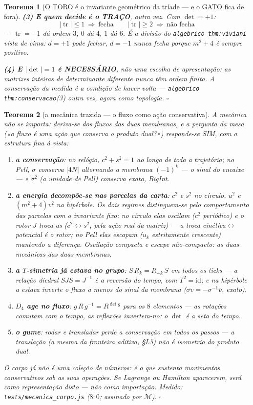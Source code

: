 \documentclass[11pt,a4paper]{article}
\newcommand{\abs}[1]{\lvert #1\rvert}
\newtheorem{teorema}{Teorema}
\newcommand{\code}[1]{\texttt{#1}}
\begin{document}
\begin{teorema}[O TORO é o invariante geométrico da tríade --- e o GATO fica de
fora]
\textbf{(3) E quem decide é o TRAÇO}, outra vez. Com $\det=+1$:
\[
\abs{\operatorname{tr}}\le1\ \Rightarrow\ \text{fecha}\qquad
\abs{\operatorname{tr}}\ge2\ \Rightarrow\ \text{não fecha}
\]
--- $\operatorname{tr}=-1$ dá ordem $3$, $0$ dá $4$, $1$ dá $6$. É a divisão do
\code{algebrico thm:viviani} vista de cima: $d=+1$ pode fechar, $d=-1$ nunca fecha porque
$m^{2}+4$ é sempre positivo.

\textbf{(4) E $\abs{\det}=1$ é NECESSÁRIO}, não uma escolha de apresentação: as matrizes
inteiras de determinante diferente \emph{nunca} têm ordem finita. \emph{A conservação da
medida é a condição de haver volta} --- \code{algebrico thm:conservacao}(3) outra vez, agora
como topologia. $\square$
\end{teorema}\begin{teorema}[a mecânica trazida --- o fluxo como ação
conservativa]\label{thm:mecanica}
A mecânica não se importa: \emph{deriva-se} dos fluxos das duas
membranas, e a pergunta da mesa («o fluxo é uma ação que conserva o
produto dual?») responde-se SIM, com a estrutura fina à vista:
\begin{enumerate}
\item \textbf{a conservação}: no relógio, $c^{2}+s^{2}=1$ ao longo de
toda a trajetória; no Pell, $\sigma$ conserva $|4N|$ \emph{alternando
a membrana} $(-1)^{k}$ --- o sinal do encaixe --- e $\sigma^{2}$ (a
unidade de Pell) conserva \emph{exato}, BigInt.
\item \textbf{a energia decompõe-se nas parcelas da carta}: $c^{2}$ e
$s^{2}$ no círculo, $u^{2}$ e $(m^{2}{+}4)v^{2}$ na hipérbole. Os dois
regimes distinguem-se pelo comportamento das parcelas com o invariante
fixo: no círculo elas \emph{oscilam} ($c^{2}$ periódico) e o rotor $J$
\emph{troca-as} ($c^{2}\leftrightarrow s^{2}$, pela ação real da
matriz) --- a troca cinética$\leftrightarrow$potencial é o rotor; no
Pell elas \emph{escapam} ($u_{k}$ estritamente crescente) mantendo a
diferença. Oscilação compacta e escape não-compacto: as duas mecânicas
das duas membranas.
\item \textbf{a $T$-simetria já estava no grupo}:
$S\,R_{k}=R_{-k}\,S$ em todos os ticks --- a relação diedral
$SJS=J^{-1}$ \emph{é} a reversão do tempo, com $T^{2}=\mathrm{id}$; e
na hipérbole a estaca inverte o fluxo a menos do sinal da membrana
($\overline{\sigma v}=-\sigma^{-1}\overline{v}$, exato).
\item \textbf{$D_{4}$ age no fluxo}: $g\,R\,g^{-1}=R^{\det g}$ para
os $8$ elementos --- as rotações comutam com o tempo, as reflexões
invertem-no: \emph{o $\det$ é a seta do tempo}.
\item \textbf{o gume}: rodar \emph{e} transladar perde a conservação
em todos os passos --- a translação (a mesma da fronteira aditiva,
\S L5) não é isometria do produto dual.
\end{enumerate}
O corpo já não é uma coleção de números: é \emph{o que sustenta
movimentos conservativos sob as suas operações}. Se Lagrange ou
Hamilton aparecerem, será como representação disto --- não como
importação.
\emph{Medido:} \code{tests/mecanica\_corpo.js} ($8{:}0$; assinado por
$\mathcal{M}$).
$\square$
\end{teorema}
\end{document}
